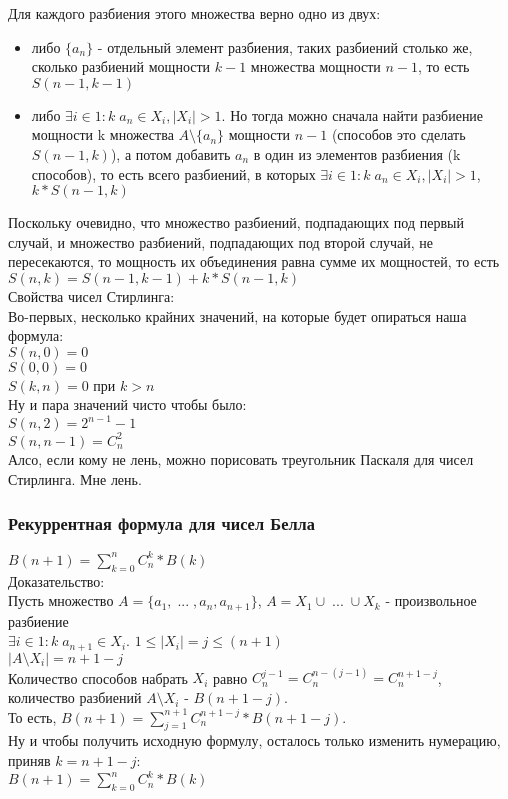 Для каждого разбиения этого множества верно одно из двух:\\
\begin{itemize}
\item либо $\{a_n\}$ - отдельный элемент разбиения, таких разбиений столько же, сколько разбиений мощности $k - 1$ множества мощности $n - 1$, то есть $S(n - 1, k - 1)$\\
\item либо $\exists i \in 1:k \; a_n \in X_i, |X_i| > 1$. Но тогда можно сначала найти разбиение мощности k множества $A \setminus \{a_n\}$ мощности $n - 1$ (способов это сделать $S(n - 1, k)$), а потом добавить $a_n$ в один из элементов разбиения (k способов), то есть всего разбиений, в которых $\exists i \in 1:k \; a_n \in X_i, |X_i| > 1$, $k * S(n - 1, k)$\\
\end{itemize}
Поскольку очевидно, что множество разбиений, подпадающих под первый случай, и множество разбиений, подпадающих под второй случай, не пересекаются, то мощность их объединения равна сумме их мощностей, то есть\\
$S(n, k) = S(n - 1, k - 1) + k * S(n - 1, k)$\\
Свойства чисел Стирлинга:\\
Во-первых, несколько крайних значений, на которые будет опираться наша формула:\\
$S(n, 0) = 0$\\
$S(0, 0) = 0$\\
$S(k, n) = 0$ при $k > n$\\
Ну и пара значений чисто чтобы было:\\
$S(n, 2) = 2^{n - 1} - 1$\\
$S(n, n - 1) = C^2_n$\\
Алсо, если кому не лень, можно порисовать треугольник Паскаля для чисел Стирлинга. Мне лень.
\subsubsection{Рекуррентная формула для чисел Белла}
$B(n + 1) = \sum\limits_{k = 0}^{n} C_n^k * B(k)$\\
Доказательство:\\
Пусть множество $A = \{a_1, \; ... \; , a_n, a_{n + 1}\}$, $A = X_1 \cup \; ... \; \cup X_k$ - произвольное разбиение\\
$\exists i \in 1:k \; a_{n + 1} \in X_i$. $1 \leq |X_i| = j \leq (n + 1)$\\
$|A \setminus X_i| = n + 1 - j$\\
Количество способов набрать $X_i$ равно $C_n^{j - 1} = C_n^{n - (j - 1)} = C_n^{n + 1 - j}$, количество разбиений $A \setminus X_i$ - $B(n + 1 - j)$.\\
То есть, $B(n + 1) = \sum\limits_{j = 1}^{n + 1}C_n^{n + 1 - j} * B(n + 1 - j)$.\\
Ну и чтобы получить исходную формулу, осталось только изменить нумерацию, приняв $k = n + 1 - j$:\\
$B(n + 1) = \sum\limits_{k = 0}^{n} C_n^k * B(k)$
